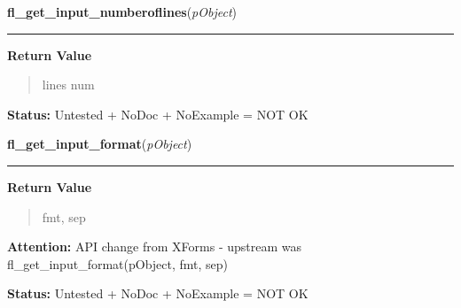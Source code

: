    \label{xformslib:library:fl_get_input_numberoflines}

    \vspace{0.5ex}

\hspace{.8\funcindent}\begin{boxedminipage}{\funcwidth}

    \raggedright \textbf{fl\_get\_input\_numberoflines}(\textit{pObject})

    \vspace{-1.5ex}

    \rule{\textwidth}{0.5\fboxrule}
\setlength{\parskip}{2ex}
\setlength{\parskip}{1ex}
      \textbf{Return Value}
    \vspace{-1ex}

      \begin{quote}
      lines num

      \end{quote}

\textbf{Status:} Untested + NoDoc + NoExample = NOT OK



    \end{boxedminipage}

    \label{xformslib:library:fl_get_input_format}

    \vspace{0.5ex}

\hspace{.8\funcindent}\begin{boxedminipage}{\funcwidth}

    \raggedright \textbf{fl\_get\_input\_format}(\textit{pObject})

    \vspace{-1.5ex}

    \rule{\textwidth}{0.5\fboxrule}
\setlength{\parskip}{2ex}
\setlength{\parskip}{1ex}
      \textbf{Return Value}
    \vspace{-1ex}

      \begin{quote}
      fmt, sep

      \end{quote}

\textbf{Attention:} API change from XForms - upstream was fl\_get\_input\_format(pObject, fmt, 
sep)



\textbf{Status:} Untested + NoDoc + NoExample = NOT OK



    \end{boxedminipage}

